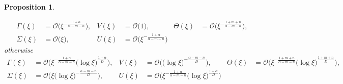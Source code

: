 \documentclass[a4paper,11pt]{article}
\def\BO{{\mathcal{O}}}
\newtheorem{proposition}{Proposition}[section]
\theoremstyle{remark}
\begin{document}
\begin{proposition}
\begin{enumerate}
  \begin{equation} \label{eq:ss_asymp1}
  \begin{aligned}
    \Gamma(\xi) &= \BO\big(\xi^{-\frac{1+\alpha}{\alpha-m-n}}), & V(\xi) &= \BO\big(1), &    \Theta(\xi) &= \BO\big(\xi^{-\frac{1+m+n}{\alpha-m-n}}),\\
   \Sigma(\xi) &= \BO\big(\xi), &   U(\xi) &= \BO\big(\xi^{-\frac{1+\alpha}{\alpha-m-n}})
  \end{aligned}
  \end{equation}
  otherwise
    \begin{equation} \label{eq:ss_asymp2}
  \begin{aligned}
    \Gamma(\xi) &= \BO\big(\xi^{-\frac{1+\alpha}{\alpha-m-n}}\big(\log\xi\big)^{\frac{1+\alpha}{D}}\big), & V(\xi) &= \BO\big(\big(\log\xi\big)^{-\frac{\alpha-m-n}{D}}\big), &    \Theta(\xi) &= \BO\big(\xi^{-\frac{1+m+n}{\alpha-m-n}}\big(\log\xi\big)^{\frac{1+m+n}{D}}\big),\\
   \Sigma(\xi) &= \BO\big(\xi\big(\log\xi\big)^{-\frac{\alpha-m-n}{D}}\big), &   U(\xi) &= \BO\big(\xi^{-\frac{1+\alpha}{\alpha-m-n}}\big(\log\xi\big)^{\frac{1+\alpha}{D}}\big)
  \end{aligned}
  \end{equation}
 \end{enumerate}

\end{proposition}
\end{document}
